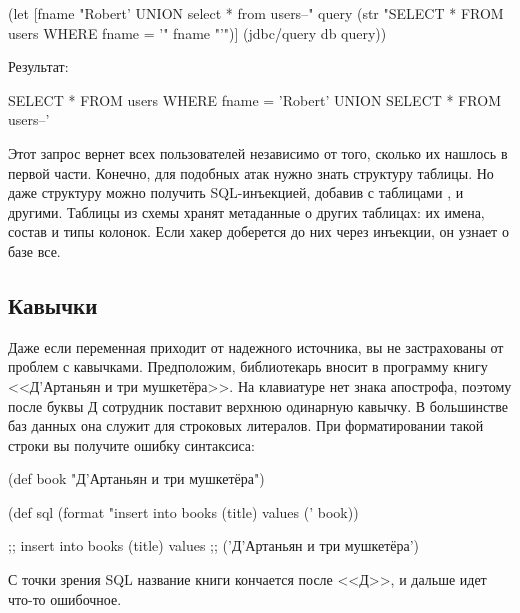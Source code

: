 \begin{english}
  \begin{clojure}
(let [fname
      "Robert' UNION select * from users--"
      query
      (str "SELECT * FROM users WHERE fname = '"
           fname
           "'")]
  (jdbc/query db query))
  \end{clojure}
\end{english}

Результат:

\begin{english}
  \begin{sql}
SELECT * FROM users WHERE fname = 'Robert'
UNION
SELECT * FROM users--'
  \end{sql}
\end{english}

Этот запрос вернет всех пользователей независимо от того, сколько их нашлось в первой части. Конечно, для подобных атак нужно знать структуру таблицы. Но даже структуру можно получить SQL-инъекцией, добавив  с таблицами ,  и другими. Таблицы из схемы  хранят метаданные о других таблицах: их имена, состав и типы колонок. Если хакер доберется до них через инъекции, он узнает о базе все.

\subsection{Кавычки}

Даже если переменная приходит от надежного источника, вы не застрахованы от проблем с кавычками. Предположим, библиотекарь вносит в программу книгу <<Д’Артаньян и три мушкетёра>>. На клавиатуре нет знака апострофа, поэтому после буквы Д сотрудник поставит верхнюю одинарную кавычку. В большинстве баз данных она служит для строковых литералов. При форматировании такой строки вы получите ошибку синтаксиса:

  \begin{clojure}
(def book "Д'Артаньян и три мушкетёра")

(def sql
  (format "insert into books (title) values ('%
          book))

;; insert into books (title) values
;; ('Д'Артаньян и три мушкетёра')
  \end{clojure}

С точки зрения SQL название книги кончается после <<Д>>, и дальше идет что-то ошибочное.

